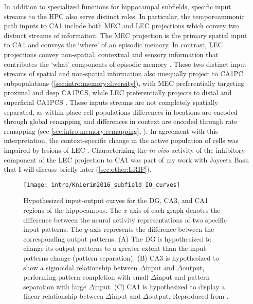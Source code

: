 In addition to specialized functions for hippocampal subfields, specific input streams to the \ac{HPC} also serve distinct roles.
In particular, the temporoammonic path inputs to CA1 include both \ac{MEC} and \ac{LEC} projections which convey two distinct streams of information.
The \ac{MEC} projection is the primary spatial input to CA1 and conveys the `where' of an episodic memory.
In contrast, \ac{LEC} projections convey non-spatial, contextual and sensory information that contributes the `what' components of episodic memory \citep{Hargreaves2005, Dickerson2010, Eichenbaum2012}.
These two distinct input streams of spatial and non-spatial information also unequally project to CA1PC subpopulations (\autoref{sec:intro:memory:diversity}), with \ac{MEC} preferentially targeting proximal and deep CA1PCS, while \ac{LEC} preferentially projects to distal and superficial CA1PCS \citep{Masurkar2017}.
These inputs streams are not completely spatially separated, as within place cell populations differences in locations are encoded through global remapping and differences in context are encoded through rate remapping (see \autoref{sec:intro:memory:remapping}, \citealp{Leutgeb2005a}).
In agreement with this interpretation, the context-specific change in the active population of cells was impaired by lesions of \ac{LEC} \citep{Lu2013}.
Characterizing the \emph{in vivo} activity of the inhibitory component of the \ac{LEC} projection to CA1 was part of my work with Jayeeta Basu that I will discuss briefly later (\autoref{sec:other:LRIP}).

\begin{figure}
	\centering
	\texttt{[image: intro/Knierim2016\_subfield\_IO\_curves]}
	\caption[Hypothesized input-output curves for the DG, CA3, and CA1 regions of the hippocampus]{Hypothesized input-output curves for the DG, CA3, and CA1 regions of the hippocampus. The $x$-axis of each graph denotes the difference between the neural activity representations of two specific input patterns. The $y$-axis represents the difference between the corresponding output patterns.
	(A) The DG is hypothesized to change its output patterns to a greater extent than the input patterns change (pattern separation).
	(B) CA3 is hypothesized to show a sigmoidal relationship between $\Delta$input and $\Delta$output, performing pattern completion with small $\Delta$input and pattern separation with large $\Delta$input.
	(C) CA1 is hypothesized to display a linear relationship between $\Delta$input and $\Delta$output.
	Reproduced from \citet{Knierim2016}.}
	\label{fig:intro:memory:subfield_IO}
\end{figure}

